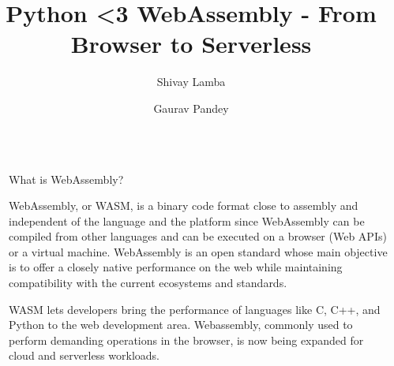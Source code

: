 \documentclass[final]{beamer}
\title{Python <3 WebAssembly - From Browser to Serverless}
\author{Shivay Lamba \inst{1} \and Gaurav Pandey \inst{2}}
\institute[shortinst]{\inst{1} shivaylamba@gmail.com \samelineand \inst{2} hi@pandeygaurav.com}
\newlength{\sepwidth}
\newlength{\colwidth}
\newcommand{\separatorcolumn}{\begin{column}{\sepwidth}\end{column}}
\begin{document}
\begin{frame}[t]
\begin{columns}[t]
        \separatorcolumn
    \begin{column}{\colwidth}
    
      \begin{block}{What is WebAssembly?}
    
        WebAssembly, or WASM, is a binary code format close to assembly and independent of the language and the platform since WebAssembly can be compiled from other languages and can be executed on a browser (Web APIs) or a virtual machine. WebAssembly is an open standard whose main objective is to offer a closely native performance on the web while maintaining compatibility with the current ecosystems and standards.
    
        WASM lets developers bring the performance of languages like C, C++, and Python to the web development area. Webassembly, commonly used to perform demanding operations in the browser, is now being expanded for cloud and serverless workloads. 
    
      \end{block}
    

\end{column}
\end{columns}
\end{frame}
\end{document}
